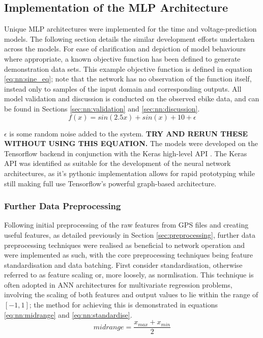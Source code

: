 \documentclass[a4paper, 10pt]{article}
\numberwithin{equation}{section}
\begin{document}
\subsection{Implementation of the MLP Architecture}
\label{sec:mlp_architecture}
Unique MLP architectures were implemented for the time and voltage-prediction models. The following section details the similar development efforts undertaken across the models. For ease of clarification and depiction of model behaviours where appropriate, a known objective function has been defined to generate demonstration data sets. This example objective function is defined in equation \ref{eq:nn:sine_eq}; note that the network has no observation of the function itself, instead only to samples of the input domain and corresponding outputs. All model validation and discussion is conducted on the observed ebike data, and can be found in Sections \ref{sec:nn:validation} and \ref{sec:nn:discussion}.
\begin{equation}
    \label{eq:nn:sine_eq}
    f(x) =  sin(2.5x) + sin(x) + 10 + \epsilon
\end{equation}

$\epsilon$ is some random noise added to the system. \textbf{TRY AND RERUN THESE WITHOUT USING THIS EQUATION.} The models were developed on the Tensorflow backend in conjunction with the Keras high-level API \cite{nn:tensorflow}. The Keras API was identified as suitable for the development of the neural network architectures, as it's pythonic implementation allows for rapid prototyping while still making full use Tensorflow's powerful graph-based architecture.

\subsubsection{Further Data Preprocessing}

Following initial preprocessing of the raw features from GPS files and creating useful features, as detailed previously in Section \ref{sec:preprocessing}, further data preprocessing techniques were realised as beneficial to network operation and were implemented as such, with the core preprocessing techniques being feature standardisation and data batching. First consider standardisation, otherwise referred to as feature scaling or, more loosely, as normlisation. This technique is often adopted in ANN architectures for multivariate regression problems, involving the scaling of both features and output values to lie within the range of $[-1,1]$; the method for achieving this is demonstrated in equations \ref{eq:nn:midrange} and \ref{eq:nn:standardise}. 
\begin{equation}
\label{eq:nn:midrange}
    midrange = \frac{x_{max} + x_{min}}{2}
\end{equation}
\end{document}
